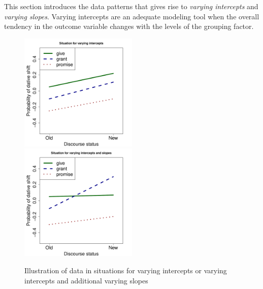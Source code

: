\documentclass[a4paper,12pt]{article}
\begin{document}
This section introduces the data patterns that gives rise to \textit{varying intercepts} and \textit{varying slopes}. 
Varying intercepts are an adequate modeling tool when the overall tendency in the outcome variable changes with the levels of the grouping factor.

\begin{figure}[!htpb]
  \centering
  \includegraphics[width=0.5\textwidth]{graphics/var_int}~\includegraphics[width=0.5\textwidth]{graphics/var_int_slope}
  \caption{Illustration of data in situations for varying intercepts or varying intercepts and additional varying slopes}
  \label{fig:varintlsope}
\end{figure}
\end{document}
